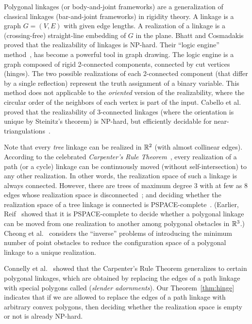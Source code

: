 \smallskip{}
Polygonal linkages (or body-and-joint frameworks) are a generalization of classical linkages (bar-and-joint frameworks) in rigidity theory. A linkage is a graph $G=(V,E)$ with given edge lengths. A realization of a linkage is a (crossing-free) straight-line embedding of $G$ in the plane.
Bhatt and Cosmadakis~\cite{BC87} proved that the realizability of linkages is NP-hard.
Their ``logic engine'' method~\cite{SFM+11,BET+99,FHW97,HK01}, has become a powerful tool in graph drawing.
The logic engine is a graph composed of rigid 2-connected components, connected by cut vertices (hinges). The two possible realizations of each 2-connected component (that differ by a single reflection)  represent the truth assignment of a binary variable. This method does not applicable to the \emph{oriented} version of the realizability, where the circular order of the neighbors of each vertex is part of the input. Cabello et al.~\cite{CDR07,EW90} proved that the realizability of 3-connected linkages (where the orientation is unique by Steinitz's theorem) is NP-hard, but efficiently decidable for near-triangulations~\cite{CDR07,BV96}.

Note that every \emph{tree} linkage can be realized in $\mathbb{R}^2$ (with almost collinear edges). According to the celebrated \emph{Carpenter's Rule Theorem}~\cite{CDR03,Str05}, every realization of a path (or a cycle) linkage can be continuously moved (without self-intersection) to any other realization. In other words, the realization space of such a linkage is always connected. However, there are trees of maximum degree 3 with at few as 8 edges whose realization space is disconnected~\cite{BCD+09}; and deciding whether the realization space of a tree linkage
is connected is PSPACE-complete~\cite{AKR+04}. (Earlier, Reif~\cite{Rei79} showed that it is PSPACE-complete to decide whether a polygonal linkage can be moved from one realization to another among polygonal obstacles in $\mathbb{R}^3$.) Cheong et al.~\cite{CdG+07} considers the ``inverse'' problems of introducing the minimum number of point obstacles to reduce the configuration space of a polygonal linkage to a unique realization.


Connelly et al.~\cite{CDD+10} showed that the Carpenter's Rule Theorem generalizes to certain polygonal linkages, which are obtained by replacing the edges of a path linkage with special polygons called (\emph{slender adornments}). Our Theorem~\ref{thm:hinge} indicates that if we are allowed to replace the edges of a path linkage with arbitrary convex polygons, then deciding whether the realization space is empty or not is already NP-hard.

